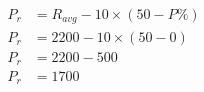 \documentclass[preview]{standalone}
\begin{document}
\begin{align*}
P_r &= R_{avg} - 10 \times (50 - P\%) \\ P_r &= 2200 - 10 \times (50 - 0) \\ P_r &= 2200 - 500 \\ P_r &= 1700
\end{align*}
\end{document}
